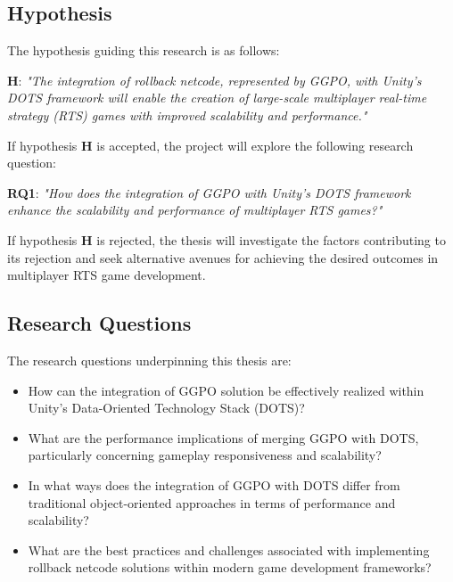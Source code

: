 \subsection{Hypothesis}

The hypothesis guiding this research is as follows:

\textbf{H}: \textit{"The integration of rollback netcode, represented by GGPO, with Unity's DOTS framework will enable the creation of large-scale multiplayer real-time strategy (RTS) games with improved scalability and performance."}\newline

If hypothesis \textbf{H} is accepted, the project will explore the following research question:

\textbf{RQ1}: \textit{"How does the integration of GGPO with Unity's DOTS framework enhance the scalability and performance of multiplayer RTS games?"}\newline

If hypothesis \textbf{H} is rejected, the thesis will investigate the factors contributing to its rejection and seek alternative avenues for achieving the desired outcomes in multiplayer RTS game development.

\subsection{Research Questions}

The research questions underpinning this thesis are:

\begin{itemize}
\item How can the integration of GGPO solution be effectively realized within Unity's Data-Oriented Technology Stack (DOTS)?
\item What are the performance implications of merging GGPO with DOTS, particularly concerning gameplay responsiveness and scalability?
\item In what ways does the integration of GGPO with DOTS differ from traditional object-oriented approaches in terms of performance and scalability?
\item What are the best practices and challenges associated with implementing rollback netcode solutions within modern game development frameworks?
\end{itemize}